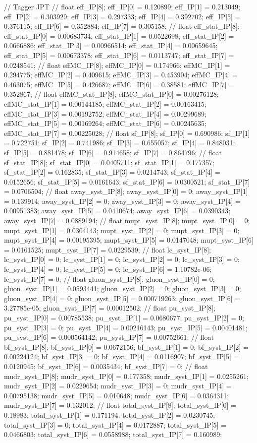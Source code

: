 // Tagger JPT
// float eff_IP[8];
eff_IP[0] = 0.120899; eff_IP[1] = 0.213049; eff_IP[2] = 0.303929; 
eff_IP[3] = 0.297333; eff_IP[4] = 0.392702; eff_IP[5] = 0.376115; 
eff_IP[6] = 0.352884; eff_IP[7] = 0.305158; 
// float eff_stat_IP[8];
eff_stat_IP[0] = 0.00683734; eff_stat_IP[1] = 0.0522698; eff_stat_IP[2] = 0.0666886; 
eff_stat_IP[3] = 0.00966514; eff_stat_IP[4] = 0.00659645; eff_stat_IP[5] = 0.00673378; 
eff_stat_IP[6] = 0.0113747; eff_stat_IP[7] = 0.0248541; 
// float effMC_IP[8];
effMC_IP[0] = 0.174966; effMC_IP[1] = 0.294775; effMC_IP[2] = 0.409615; 
effMC_IP[3] = 0.453904; effMC_IP[4] = 0.463075; effMC_IP[5] = 0.426687; 
effMC_IP[6] = 0.38581; effMC_IP[7] = 0.352867; 
// float effMC_stat_IP[8];
effMC_stat_IP[0] = 0.00276128; effMC_stat_IP[1] = 0.00144185; effMC_stat_IP[2] = 0.00163415; 
effMC_stat_IP[3] = 0.00192752; effMC_stat_IP[4] = 0.00299689; effMC_stat_IP[5] = 0.00169264; 
effMC_stat_IP[6] = 0.00245635; effMC_stat_IP[7] = 0.00225028; 
// float sf_IP[8];
sf_IP[0] = 0.690986; sf_IP[1] = 0.722751; sf_IP[2] = 0.741986; 
sf_IP[3] = 0.655057; sf_IP[4] = 0.848031; sf_IP[5] = 0.881478; 
sf_IP[6] = 0.914658; sf_IP[7] = 0.864796; 
// float sf_stat_IP[8];
sf_stat_IP[0] = 0.0405711; sf_stat_IP[1] = 0.177357; sf_stat_IP[2] = 0.162835; 
sf_stat_IP[3] = 0.0214743; sf_stat_IP[4] = 0.0152656; sf_stat_IP[5] = 0.0161643; 
sf_stat_IP[6] = 0.0300521; sf_stat_IP[7] = 0.0706504; 
// float away_syst_IP[8];
away_syst_IP[0] = 0; away_syst_IP[1] = 0.139914; away_syst_IP[2] = 0; 
away_syst_IP[3] = 0; away_syst_IP[4] = 0.00951383; away_syst_IP[5] = 0.0410674; 
away_syst_IP[6] = 0.0390343; away_syst_IP[7] = 0.0889194; 
// float mupt_syst_IP[8];
mupt_syst_IP[0] = 0; mupt_syst_IP[1] = 0.0304143; mupt_syst_IP[2] = 0; 
mupt_syst_IP[3] = 0; mupt_syst_IP[4] = 0.00195395; mupt_syst_IP[5] = 0.0147048; 
mupt_syst_IP[6] = 0.0161525; mupt_syst_IP[7] = 0.0229539; 
// float lc_syst_IP[8];
lc_syst_IP[0] = 0; lc_syst_IP[1] = 0; lc_syst_IP[2] = 0; 
lc_syst_IP[3] = 0; lc_syst_IP[4] = 0; lc_syst_IP[5] = 0; 
lc_syst_IP[6] = 1.10782e-06; lc_syst_IP[7] = 0; 
// float gluon_syst_IP[8];
gluon_syst_IP[0] = 0; gluon_syst_IP[1] = 0.0593441; gluon_syst_IP[2] = 0; 
gluon_syst_IP[3] = 0; gluon_syst_IP[4] = 0; gluon_syst_IP[5] = 0.000719263; 
gluon_syst_IP[6] = 3.27785e-05; gluon_syst_IP[7] = 0.00012502; 
// float pu_syst_IP[8];
pu_syst_IP[0] = 0.00785538; pu_syst_IP[1] = 0.0680677; pu_syst_IP[2] = 0; 
pu_syst_IP[3] = 0; pu_syst_IP[4] = 0.00216143; pu_syst_IP[5] = 0.00401481; 
pu_syst_IP[6] = 0.000564142; pu_syst_IP[7] = 0.00752661; 
// float bf_syst_IP[8];
bf_syst_IP[0] = 0.0672156; bf_syst_IP[1] = 0; bf_syst_IP[2] = 0.00224124; 
bf_syst_IP[3] = 0; bf_syst_IP[4] = 0.0116907; bf_syst_IP[5] = 0.0120945; 
bf_syst_IP[6] = 0.0035434; bf_syst_IP[7] = 0; 
// float mudr_syst_IP[8];
mudr_syst_IP[0] = 0.177358; mudr_syst_IP[1] = 0.0255261; mudr_syst_IP[2] = 0.0229654; 
mudr_syst_IP[3] = 0; mudr_syst_IP[4] = 0.00795138; mudr_syst_IP[5] = 0.010648; 
mudr_syst_IP[6] = 0.0364311; mudr_syst_IP[7] = 0.132012; 
// float total_syst_IP[8];
total_syst_IP[0] = 0.18983; total_syst_IP[1] = 0.171194; total_syst_IP[2] = 0.0230745; 
total_syst_IP[3] = 0; total_syst_IP[4] = 0.0172887; total_syst_IP[5] = 0.0466803; 
total_syst_IP[6] = 0.0558988; total_syst_IP[7] = 0.160989; 




